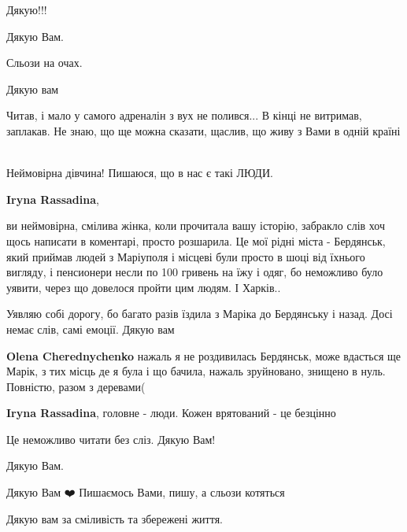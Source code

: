 
Дякую!!!


Дякую Вам.


Сльози на очах.

Дякую вам


Читав, і мало у самого адреналін з вух не полився... В кінці не витримав,
заплакав. Не знаю, що ще можна сказати, щаслив, що живу з Вами в одній країні
🤗


Неймовірна дівчина! Пишаюся, що в нас є такі ЛЮДИ.

\textbf{Iryna Rassadina}, 

ви неймовірна, смілива жінка, коли прочитала вашу історію, забракло слів хоч
щось написати в коментарі, просто розшарила. Це мої рідні міста - Бердянськ,
який приймав людей з Маріуполя і місцеві були просто в шоці від їхнього
вигляду, і пенсионери несли по 100 гривень на їжу і одяг, бо неможливо було
уявити, через що довелося пройти цим людям. І Харків..

Уявляю собі дорогу, бо багато разів їздила з Маріка до Бердянську і назад. Досі
немає слів, самі емоції. Дякую вам

\begin{itemize} %
\textbf{Olena Cherednychenko} нажаль я не роздивилась Бердянськ, може вдасться ще
Марік, з тих місць де я була і що бачила, нажаль зруйновано, знищено в нуль. Повністю, разом з деревами(

\textbf{Iryna Rassadina}, головне - люди. Кожен врятований - це безцінно

\end{itemize} %


Це неможливо читати без сліз. Дякую Вам!


Дякую Вам.


Дякую Вам ❤️ Пишаємось Вами, пишу, а сльози котяться


Дякую вам за сміливість та збережені життя.


